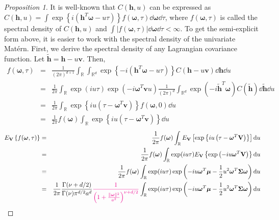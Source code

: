 \documentclass[12pt]{article}
\newcommand{\0}{\mathbf{0}}
\newtheorem{proof}{Proof}
\begin{document}
\begin{proof}[Proposition 1]
It is well-known that $C(\mathbf{h},u)$ can be expressed as $C(\mathbf{h},u)=\int \exp\left\{i\left(\mathbf{h}^T\boldsymbol{\omega}-u\tau\right) \right\} f(\boldsymbol{\omega},\tau)\dd \boldsymbol{\omega}\dd\tau $, where $f(\boldsymbol{\omega},\tau)$ is called the spectral density of $C(\mathbf{h},u)$ and $\int | f(\boldsymbol{\omega},\tau)|\dd\boldsymbol{\omega}\dd\tau <\infty$. To get the semi-explicit form above, it is easier to work with the spectral density of the univariate Mat\'{e}rn. First, we derive the spectral density of any Lagrangian covariance function. Let $\tilde{\mathbf{h}}=\mathbf{h}-u\mathbf{v}$. Then,
\begin{eqnarray*}
f(\boldsymbol{\omega},\tau)  &=& \frac{1}{(2\pi)^{d+1}} \int_{\mathbb{R}} \int_{\mathbb{R}^d} \exp \left\{-i\left(\mathbf{h}^T\boldsymbol{\omega}-u\tau\right) \right\} C(\mathbf{h}-u\mathbf{v}) \dd\mathbf{h}\dd u \nonumber \\
&=&  \frac{1}{2\pi} \int_{\mathbb{R}}\exp\left(iu\tau\right)\exp\left(-i\boldsymbol{\omega}^T\mathbf{v}u\right)\frac{1}{(2\pi)^d}\int_{\mathbb{R}^d} \exp\left(-i\tilde{\mathbf{h}}^T\boldsymbol{\omega}\right) C(\tilde{\mathbf{h}}) \dd \tilde{\mathbf{h}}\dd u \nonumber\\
&=&\frac{1}{2\pi} \int_{\mathbb{R}} \exp\left\{iu\left(\tau-\boldsymbol{\omega}^T\mathbf{v}\right) \right\}f(\boldsymbol{\omega},0)\dd u \nonumber \\
&=&\frac{1}{2\pi} f(\boldsymbol{\omega})\int_{\mathbb{R}} \exp\left\{iu\left(\tau-\boldsymbol{\omega}^T\mathbf{v}\right) \right\}\dd u \nonumber
\end{eqnarray*}
\begin{eqnarray}
E_{\mathbf{V}}\left\{f(\boldsymbol{\omega},\tau)\right\}&=&\frac{1}{2\pi} f(\boldsymbol{\omega})  \int_{\mathbb{R}} E_{\mathbf{V}}\left[\exp\left\{iu\left(\tau-\boldsymbol{\omega}^T\mathbf{V}\right) \right\}\right]\dd u \nonumber \\
&=&\frac{1}{2\pi} f(\boldsymbol{\omega})  \int_{\mathbb{R}} \exp(iu\tau)E_{\mathbf{V}}\left\{\exp\left(-iu\boldsymbol{\omega}^T\mathbf{V}\right) \right\}\dd u \nonumber \\
&=&\frac{1}{2\pi} f(\boldsymbol{\omega})  \int_{\mathbb{R}} \exp(iu\tau) \exp\left(-iu\boldsymbol{\omega}^T\boldsymbol{\mu}-\frac{1}{2}u^2\boldsymbol{\omega}^T\boldsymbol{\Sigma}\boldsymbol{\omega}\right) \dd u\label{eqn:gaussianfouriertransform}\\
&=&\frac{1}{2\pi}\frac{\Gamma(\nu+d/2)}{ \Gamma(\nu)\pi^{d/2}a^{d}} \textcolor{magenta}{\frac{1}{\left(1+\frac{\|\boldsymbol{\omega}\|^2}{a^2}\right)^{\nu+d/2}}}  \int_{\mathbb{R}} \exp(iu\tau) \exp\left(-iu\boldsymbol{\omega}^T\boldsymbol{\mu}-\frac{1}{2}u^2\boldsymbol{\omega}^T\boldsymbol{\Sigma}\boldsymbol{\omega}\right) \dd u  \nonumber \\

\end{eqnarray}
\end{proof}
\end{document}
